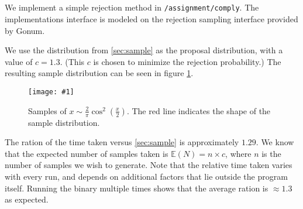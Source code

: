 \documentclass[10pt, a4paper]{article}
\newcommand{\plot}[3]{\begin{figure}[ht]\centering\texttt{[image: \#1]}\caption{#2}\label{#3}\end{figure}}
\begin{document}
  \subsection{}
  We implement a simple rejection method in \texttt{/assignment/comply}. The implementations
  interface is modeled on the rejection sampling interface provided by Gonum.

  We use the distribution from \ref{sec:sample} as the proposal distribution, with a value
  of $c = 1.3$. (This $c$ is chosen to minimize the rejection probability.) The resulting
  sample distribution can be seen in figure \ref{fig:reject}.

  \plot{assignment-q-5-c}{
    Samples of $x \sim \frac{2}{\pi} \cos^2(\frac{x}{2})$. The red line indicates the shape of
    the sample distribution.
  }{fig:reject}

  The ration of the time taken versus \ref{sec:sample} is approximately $1.29$. We know that the
  expected number of samples taken is $\mathbb{E}(N) = n \times c$, where $n$ is the number of samples we
  wish to generate. Note that the relative time taken varies with every run, and depends on additional
  factors that lie outside the program itself. Running the binary multiple times shows that the
  average ration is $\approx 1.3$ as expected.

{}

\end{document}
